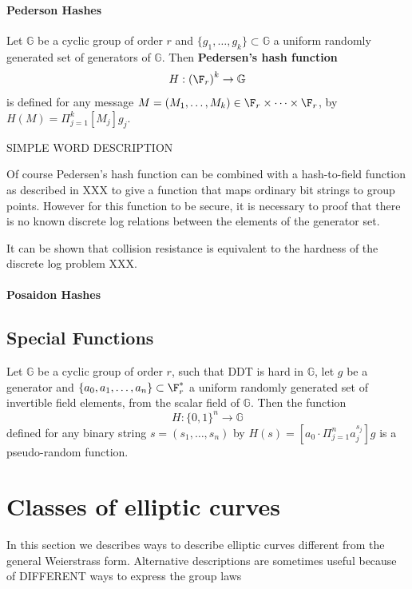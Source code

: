 \paragraph{Pederson Hashes}
\begin{definition}
Let $\mathbb{G}$ be a cyclic group of order $r$ and $\{g_1, \ldots, g_k\} \subset \mathbb{G}$ a uniform randomly generated set of generators of $\mathbb{G}$. Then \textbf{Pedersen’s hash function} 
$$
H : \left(\F_r\right)^k \to \mathbb{G}
$$
is defined for any message $M = (M_1,\ldots,M_k)\in \F_r \times \cdots \times \F_r$, 
by $H(M) =\Pi_{j=1}^k [M_j]g_j$.
\end{definition}
SIMPLE WORD DESCRIPTION
\begin{remark} Of course Pedersen's hash function can be combined with a hash-to-field function as described in XXX to give a function that maps ordinary bit strings to group points. However
for this function to be secure, it is necessary to proof that there is no known discrete log relations between the elements of the generator set.

It can be shown that collision resistance is equivalent to the hardness of the discrete log problem XXX.
\end{remark}
\begin{example}

\end{example}
\paragraph{Posaidon Hashes}
\subsection{Special Functions}
\begin{theorem}
Let $\mathbb{G}$ be a cyclic group of order $r$, such that DDT is hard in $\mathbb{G}$, let $g$ be a generator and $\{a_0,a_1,\ldots,a_n\}\subset \F_{r}^*$ a uniform randomly generated set of invertible field elements, from the scalar field of $\mathbb{G}$. Then the function
$$
H: \{0,1\}^n \to \mathbb{G}
$$
defined for any binary string $s=(s_1,\ldots,s_n)$ by $H(s)= [a_0\cdot \Pi_{j=1}^n a_j^{s_j}]g$
is a pseudo-random function.
\end{theorem}


\section{Classes of elliptic curves}
In this section we describes ways to describe elliptic curves different from the general Weierstrass form. Alternative descriptions are sometimes useful because of DIFFERENT ways to express the group laws


